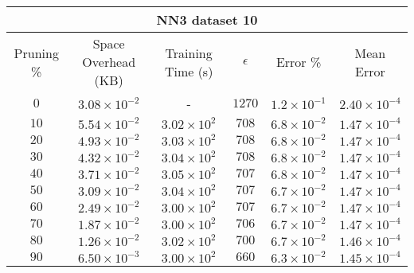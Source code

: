 \begin{adjustwidth}{0cm}{}
\begin{tabular}{cccccc}
\hline
\multicolumn{6}{c}{NN3 dataset 10} \\
\toprule
Pruning \% & Space Overhead (KB) & Training Time (s) & $\epsilon$ & Error \% & Mean Error\\
\midrule
$0$ & $3.08 \times 10^{-2}$ & - & $1270$ & $1.2 \times 10^{-1}$ & $2.40 \times 10^{-4}$\\
$10$ & $5.54 \times 10^{-2}$ & $3.02 \times 10^{2}$ & $708$ & $6.8 \times 10^{-2}$ & $1.47 \times 10^{-4}$\\
$20$ & $4.93 \times 10^{-2}$ & $3.03 \times 10^{2}$ & $708$ & $6.8 \times 10^{-2}$ & $1.47 \times 10^{-4}$\\
$30$ & $4.32 \times 10^{-2}$ & $3.04 \times 10^{2}$ & $708$ & $6.8 \times 10^{-2}$ & $1.47 \times 10^{-4}$\\
$40$ & $3.71 \times 10^{-2}$ & $3.05 \times 10^{2}$ & $707$ & $6.8 \times 10^{-2}$ & $1.47 \times 10^{-4}$\\
$50$ & $3.09 \times 10^{-2}$ & $3.04 \times 10^{2}$ & $707$ & $6.7 \times 10^{-2}$ & $1.47 \times 10^{-4}$\\
$60$ & $2.49 \times 10^{-2}$ & $3.00 \times 10^{2}$ & $707$ & $6.7 \times 10^{-2}$ & $1.47 \times 10^{-4}$\\
$70$ & $1.87 \times 10^{-2}$ & $3.00 \times 10^{2}$ & $706$ & $6.7 \times 10^{-2}$ & $1.47 \times 10^{-4}$\\
$80$ & $1.26 \times 10^{-2}$ & $3.02 \times 10^{2}$ & $700$ & $6.7 \times 10^{-2}$ & $1.46 \times 10^{-4}$\\
$90$ & $6.50 \times 10^{-3}$ & $3.00 \times 10^{2}$ & $660$ & $6.3 \times 10^{-2}$ & $1.45 \times 10^{-4}$\\
\bottomrule
\end{tabular}
\end{adjustwidth}